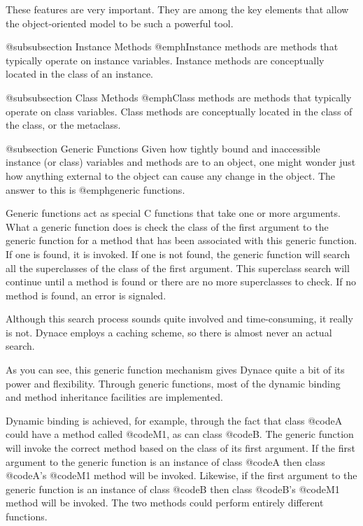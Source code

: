 These features are very important.  They are among the key elements
that allow the object-oriented model to be such a powerful tool.

@subsubsection Instance Methods
@emph{Instance methods} are methods that typically operate on instance
variables.  Instance methods are conceptually located in the class of
an instance.

@subsubsection Class Methods
@emph{Class methods} are methods that typically operate on class
variables.  Class methods are conceptually located in the class of
the class, or the metaclass.

@subsection Generic Functions
Given how tightly bound and inaccessible instance (or class) variables and
methods are to an object, one might wonder just how anything external
to the object can cause any change in the object.  The answer to this is
@emph{generic functions}.

Generic functions act as special C functions that take one or more
arguments.  What a generic function does is check the class of the first
argument to the generic function for a method that has been associated
with this generic function.  If one is found, it is invoked.  If one is not
found, the generic function will search all the superclasses of the class of
the first argument.  This superclass search will continue until a method
is found or there are no more superclasses to check.  If no method
is found, an error is signaled.

Although this search process sounds quite involved and time-consuming, it
really is not.  Dynace employs a caching scheme, so there is almost never
an actual search.

As you can see, this generic function mechanism gives Dynace quite a bit of
its power and flexibility.  Through generic functions, most of the
dynamic binding and method inheritance facilities are implemented.

Dynamic binding is achieved, for example, through the fact that class
@code{A} could have a method called @code{M1}, as can class @code{B}.
The generic function will invoke the correct method based on the class
of its first argument.  If the first argument to the generic function is an
instance of class @code{A} then class @code{A}'s @code{M1} method will
be invoked.  Likewise, if the first argument to the generic function is an
instance of class @code{B} then class @code{B}'s @code{M1} method will
be invoked.  The two methods could perform entirely different functions.

